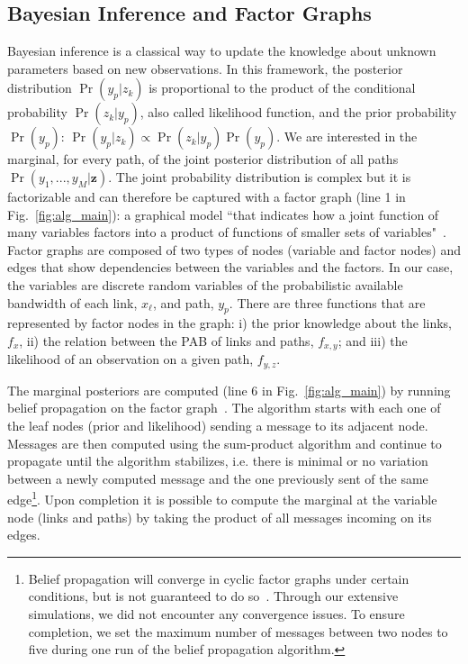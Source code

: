 \documentclass[final,5p,times,twocolumn]{elsarticle}
\begin{document}
\subsection{Bayesian Inference and Factor Graphs}
\label{ssec:bay_inf_fac_gra}

Bayesian inference is a classical way to update the knowledge about unknown parameters based on new observations.  
In this framework, the posterior distribution $\Pr(y_p | z_k)$ is proportional to the product of the conditional probability $\Pr(z_k | y_p)$, also called likelihood function, and the prior probability $\Pr(y_p)$: $\Pr(y_p | z_k) \propto \Pr(z_k | y_p) \Pr (y_p)$.  We are interested in the marginal, for every path, of the joint posterior distribution of all paths $\Pr(y_1,...,y_M | \mathbf{z})$.  
The joint probability distribution is complex but it is factorizable and can therefore be captured with a factor graph (line 1 in Fig.~\ref{fig:alg_main}): a graphical model ``that indicates how a joint function of many variables factors into a product of functions of smaller sets of variables"~\cite{fre:98}.  
Factor graphs are composed of two types of nodes (variable and factor nodes) and edges that show dependencies between the variables and the factors.
In our case, the variables are discrete random variables of the probabilistic available bandwidth of each link, $x_{\ell}$, and path, $y_p$.  There are three functions that are represented by factor nodes in the graph: i) the prior knowledge about the links, $f_x$, ii) the relation between the PAB of links and paths, $f_{x,y}$; and iii) the likelihood of an observation on a given path, $f_{y,z}$.

The marginal posteriors are computed (line 6 in Fig.~\ref{fig:alg_main}) by running belief propagation on the factor graph~\cite{pea:88}. The algorithm starts with each one of the leaf nodes (prior and likelihood) sending a message to its adjacent node.  Messages are then computed using the sum-product algorithm and continue to propagate until the algorithm stabilizes, i.e. there is minimal or no variation between a newly computed message and the one previously sent of the same edge\footnote{Belief propagation will converge in cyclic factor graphs under certain conditions, but is not guaranteed to do so~\cite{moo:07}.  Through our extensive simulations, we did not encounter any convergence issues.  To ensure completion, we set the maximum number of messages between two nodes to five during one run of the belief propagation algorithm.}.  Upon completion it is possible to compute the marginal at the variable node (links and paths) by taking the product of all messages incoming on its edges.
\end{document}
